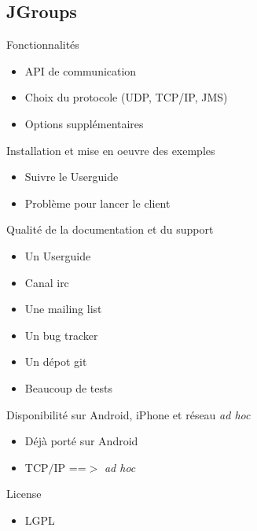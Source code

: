\documentclass{beamer}
\begin{document}
\subsection{JGroups}

\begin{frame}
  \begin{block}{Fonctionnalités}
    \begin{itemize}
      \item API de communication
      \item Choix du protocole (UDP, TCP/IP, JMS)
      \item Options supplémentaires
    \end{itemize}
  \end{block}
  \begin{block}{Installation et mise en oeuvre des exemples}
    \begin{itemize}
      \item Suivre le Userguide
      \item Problème pour lancer le client
    \end{itemize}
  \end{block}
\end{frame}
\begin{frame}
  \begin{block}{Qualité de la documentation et du support}
    \begin{itemize}
      \item Un Userguide
      \item Canal irc
      \item Une mailing list
      \item Un bug tracker
      \item Un dépot git
      \item Beaucoup de tests
    \end{itemize}
  \end{block}
  \begin{block}{Disponibilité sur Android, iPhone et réseau \emph{ad hoc}}
    \begin{itemize}
      \item Déjà porté sur Android
      \item TCP$/$IP ==$>$ \emph{ad hoc}
    \end{itemize}
  \end{block}
  \begin{block}{License}
    \begin{itemize}
      \item LGPL
    \end{itemize}
  \end{block}
\end{frame}
\end{document}
